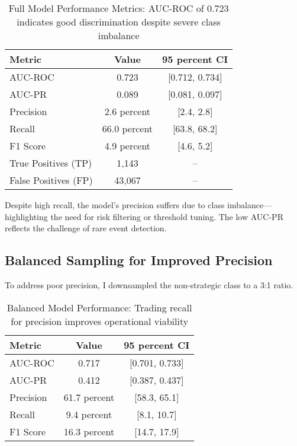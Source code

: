 \begin{table}[H]
\centering
\caption{Full Model Performance Metrics: AUC-ROC of 0.723 indicates good discrimination despite severe class imbalance}
\label{tab:full_model_performance}
\begin{tabular}{lcc}
\toprule
Metric & Value & 95 percent CI \\
\midrule
AUC-ROC & 0.723 & [0.712, 0.734] \\
AUC-PR & 0.089 & [0.081, 0.097] \\
Precision & 2.6 percent & [2.4, 2.8] \\
Recall & 66.0 percent & [63.8, 68.2] \\
F1 Score & 4.9 percent & [4.6, 5.2] \\
True Positives (TP) & 1,143 & -- \\
False Positives (FP) & 43,067 & -- \\
\bottomrule
\end{tabular}
\end{table}

Despite high recall, the model's precision suffers due to class imbalance—highlighting the need for risk filtering or threshold tuning. The low AUC-PR reflects the challenge of rare event detection.

\subsection{Balanced Sampling for Improved Precision}

To address poor precision, I downsampled the non-strategic class to a 3:1 ratio.

\begin{table}[H]
\centering
\caption{Balanced Model Performance: Trading recall for precision improves operational viability}
\label{tab:balanced_model_performance}
\begin{tabular}{lcc}
\toprule
Metric & Value & 95 percent CI \\
\midrule
AUC-ROC & 0.717 & [0.701, 0.733] \\
AUC-PR & 0.412 & [0.387, 0.437] \\
Precision & 61.7 percent & [58.3, 65.1] \\
Recall & 9.4 percent & [8.1, 10.7] \\
F1 Score & 16.3 percent & [14.7, 17.9] \\
\bottomrule
\end{tabular}
\end{table}

